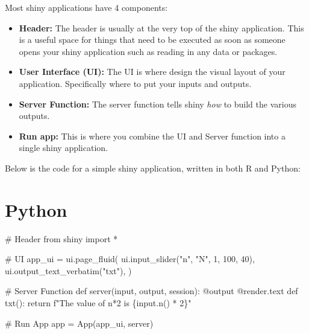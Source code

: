 \documentclass[
  letterpaper,
  DIV=11,
  numbers=noendperiod]{scrreprt}
\newenvironment{Shaded}{\begin{snugshade}}{\end{snugshade}}
\newcommand{\AttributeTok}[1]{\textcolor[rgb]{0.40,0.45,0.13}{#1}}
\newcommand{\BuiltInTok}[1]{\textcolor[rgb]{0.00,0.23,0.31}{#1}}
\newcommand{\CommentTok}[1]{\textcolor[rgb]{0.37,0.37,0.37}{#1}}
\newcommand{\ControlFlowTok}[1]{\textcolor[rgb]{0.00,0.23,0.31}{#1}}
\newcommand{\DecValTok}[1]{\textcolor[rgb]{0.68,0.00,0.00}{#1}}
\newcommand{\ImportTok}[1]{\textcolor[rgb]{0.00,0.46,0.62}{#1}}
\newcommand{\KeywordTok}[1]{\textcolor[rgb]{0.00,0.23,0.31}{#1}}
\newcommand{\NormalTok}[1]{\textcolor[rgb]{0.00,0.23,0.31}{#1}}
\newcommand{\OperatorTok}[1]{\textcolor[rgb]{0.37,0.37,0.37}{#1}}
\newcommand{\SpecialCharTok}[1]{\textcolor[rgb]{0.37,0.37,0.37}{#1}}
\newcommand{\SpecialStringTok}[1]{\textcolor[rgb]{0.13,0.47,0.30}{#1}}
\newcommand{\StringTok}[1]{\textcolor[rgb]{0.13,0.47,0.30}{#1}}
\begin{document}
Most shiny applications have 4 components:

\begin{itemize}
\item
  \textbf{Header:} The header is usually at the very top of the shiny
  application. This is a useful space for things that need to be
  executed as soon as someone opens your shiny application such as
  reading in any data or packages.
\item
  \textbf{User Interface (UI):} The UI is where design the visual layout
  of your application. Specifically where to put your inputs and
  outputs.
\item
  \textbf{Server Function:} The server function tells shiny \emph{how}
  to build the various outputs.
\item
  \textbf{Run app:} This is where you combine the UI and Server function
  into a single shiny application.
\end{itemize}

Below is the code for a simple shiny application, written in both R and
Python:

\section{Python}

\begin{Shaded}
\begin{Highlighting}[]
\CommentTok{\# Header}
\ImportTok{from}\NormalTok{ shiny }\ImportTok{import} \OperatorTok{*}

\CommentTok{\# UI}
\NormalTok{app\_ui }\OperatorTok{=}\NormalTok{ ui.page\_fluid(}
\NormalTok{    ui.input\_slider(}\StringTok{"n"}\NormalTok{, }\StringTok{"N"}\NormalTok{, }\DecValTok{1}\NormalTok{, }\DecValTok{100}\NormalTok{, }\DecValTok{40}\NormalTok{),}
\NormalTok{    ui.output\_text\_verbatim(}\StringTok{"txt"}\NormalTok{),}
\NormalTok{)}

\CommentTok{\# Server Function}
\KeywordTok{def}\NormalTok{ server(}\BuiltInTok{input}\NormalTok{, output, session):}
    \AttributeTok{@output}
    \AttributeTok{@render.text}
    \KeywordTok{def}\NormalTok{ txt():}
        \ControlFlowTok{return} \SpecialStringTok{f"The value of n*2 is }\SpecialCharTok{\{}\BuiltInTok{input}\SpecialCharTok{.}\NormalTok{n() }\OperatorTok{*} \DecValTok{2}\SpecialCharTok{\}}\SpecialStringTok{"}

\CommentTok{\# Run App}
\NormalTok{app }\OperatorTok{=}\NormalTok{ App(app\_ui, server)}
\end{Highlighting}
\end{Shaded}
\end{document}
